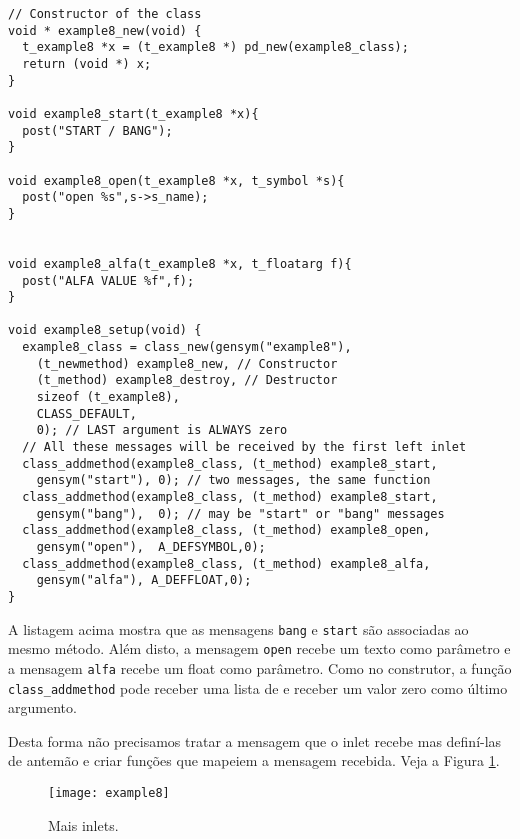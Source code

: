 \begin{lstlisting}[caption=Passagem de mensagens para o primeiro inlet]
// Constructor of the class
void * example8_new(void) {
  t_example8 *x = (t_example8 *) pd_new(example8_class);
  return (void *) x;
}

void example8_start(t_example8 *x){
  post("START / BANG");
}

void example8_open(t_example8 *x, t_symbol *s){
  post("open %s",s->s_name);
}


void example8_alfa(t_example8 *x, t_floatarg f){
  post("ALFA VALUE %f",f);
}

void example8_setup(void) {
  example8_class = class_new(gensym("example8"),
    (t_newmethod) example8_new, // Constructor
    (t_method) example8_destroy, // Destructor
    sizeof (t_example8),
    CLASS_DEFAULT,
    0); // LAST argument is ALWAYS zero
  // All these messages will be received by the first left inlet
  class_addmethod(example8_class, (t_method) example8_start, 
    gensym("start"), 0); // two messages, the same function
  class_addmethod(example8_class, (t_method) example8_start, 
    gensym("bang"),  0); // may be "start" or "bang" messages
  class_addmethod(example8_class, (t_method) example8_open,  
    gensym("open"),  A_DEFSYMBOL,0);
  class_addmethod(example8_class, (t_method) example8_alfa,  
    gensym("alfa"), A_DEFFLOAT,0); 
}
\end{lstlisting}

A listagem acima mostra que as mensagens \texttt{bang} e \texttt{start} são
associadas ao mesmo método.
Além disto, a mensagem \texttt{open} recebe um texto como parâmetro e a mensagem
\texttt{alfa} recebe um float como parâmetro.
Como no construtor, a função \texttt{class\_addmethod} pode receber uma lista de
e receber um valor zero como último argumento.

Desta forma não precisamos tratar a mensagem que o inlet recebe mas definí-las
de antemão e criar funções que mapeiem a mensagem recebida.
Veja a Figura \ref{fig:mais-inlets}.

\begin{figure}[h!]
\centering
\texttt{[image: example8]}
\caption{Mais inlets.}
\label{fig:mais-inlets}
\end{figure}

